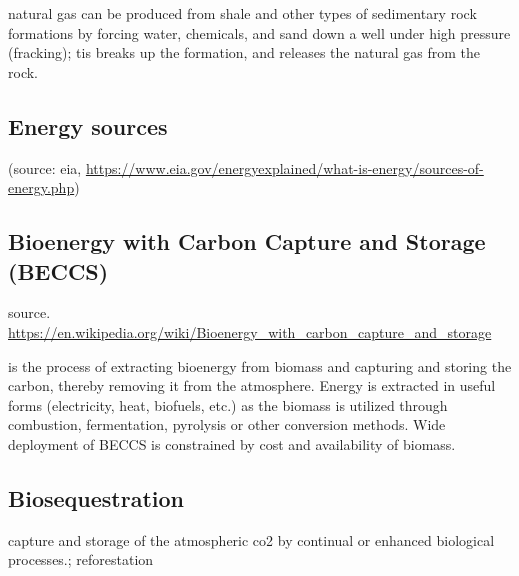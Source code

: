 natural gas can be produced from shale and other types of sedimentary rock formations by forcing water, chemicals, and sand down a well under high pressure (fracking); tis breaks up the formation, and releases the natural gas from the rock. 
\subsection{Energy sources}
(source: eia, \url{https://www.eia.gov/energyexplained/what-is-energy/sources-of-energy.php})

\subsection{Bioenergy with Carbon Capture and Storage (BECCS)}
source. \url{https://en.wikipedia.org/wiki/Bioenergy_with_carbon_capture_and_storage}

 is the process of extracting bioenergy from biomass and capturing and storing the carbon, thereby removing it from the atmosphere. Energy is extracted in useful forms (electricity, heat, biofuels, etc.) as the biomass is utilized through combustion, fermentation, pyrolysis or other conversion methods.
Wide deployment of BECCS is constrained by cost and availability of biomass.

\subsection{Biosequestration} capture and storage of the atmospheric co2 by continual or enhanced biological processes.; reforestation

